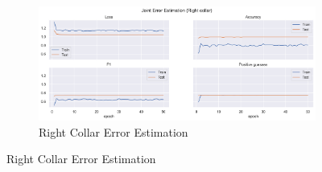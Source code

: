 \begin{figure}[!ht]
\begin{subfigure}[b]{0.47\linewidth}
      \label{fig:v1_leco_jt_ee}
  \end{subfigure}
  \hfill
  \begin{subfigure}[b]{0.47\linewidth}
      \centering
      \includegraphics[width=\textwidth]{figures/Results/v1/jt/Right collar_ErrorEstimation.png}
      \caption{Right Collar Error Estimation}
      \label{fig:v1_rico_jt_ee}
  \end{subfigure}
\end{figure}


